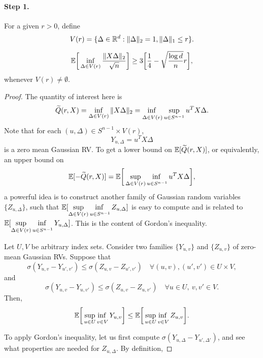 \paragraph{Step 1.}
For a given $r>0$, define
\begin{equation}
    V(r)=\{\Delta\in{\mathbb{R}}^d:\|\Delta\|_2=1,\|\Delta\|_1\le r\}.
\end{equation}
\begin{pro}\label{pro:b1}
    \begin{equation}
        \mathbb{E}\bigg[\inf_{\Delta\in V(r)}\frac{\|X\Delta\|_2}{\sqrt{n}}\bigg]\ge
            3\bigg[\frac{1}{4}-\sqrt{\frac{\log d}{n}}r\bigg],
    \end{equation}
    whenever $V(r)\neq \emptyset$.
\end{pro}
\begin{proof}
The quantity of interest here is
\begin{equation}
    \widetilde Q(r,X) = \inf_{\Delta\in V(r)}\|X\Delta\|_2
        = \adjustlimits\inf_{\Delta\in V(r)}\sup_{u\in S^{n-1}}u^TX\Delta.
\end{equation}
Note that for each $(u,\Delta)\in S^{n-1}\times V(r)$,
\begin{equation}
Y_{u,\Delta}=u^TX\Delta
\end{equation}
is a zero mean Gaussian RV.
To get a lower bound on $\mathbb{E}[\widetilde Q(r,X)]$,
or equivalently,
an upper bound on
\begin{equation}
    \Ebb[-\widetilde Q(r,X)] =
        \Ebb\bigg[\adjustlimits\sup_{\Delta\in V(r)}\inf_{u\in S^{n-1}}u^TX\Delta\bigg],
\end{equation}
a powerful idea is to construct another family of Gaussian random variables
$\{Z_{u,\Delta}\}$,
such that $\Ebb[\adjustlimits\sup_{\Delta\in V(r)}\inf_{u\in S^{n-1}}Z_{u,\Delta}]$
is easy to compute and is related to
$\Ebb[\adjustlimits\sup_{\Delta\in V(r)}\inf_{u\in S^{n-1}}Y_{u,\Delta}]$.
This is the content of Gordon's inequality.
\begin{fact}\label{fact:gordon}
Let $U,V$ be arbitrary index sets.
Consider two families $\{Y_{u,v}\}$ and $\{Z_{u,v}\}$ of zero-mean Gaussian RVs.
Suppose that
\begin{equation}
    \sigma(Y_{u,v}-Y_{u',v'})\le\sigma(Z_{u,v}-Z_{u',v'})\quad
    \forall(u,v),(u',v')\in U\times V,
\end{equation}
and
\begin{equation}
    \sigma(Y_{u,v}-Y_{u,v'})\le\sigma(Z_{u,v}-Z_{u,v'})\quad
    \forall u\in U,~ v,v'\in V.
\end{equation}
Then,
\begin{equation}
    \Ebb\bigg[\adjustlimits\sup_{u\in U}\inf_{v\in V}Y_{u,v}\bigg]\le
    \Ebb\bigg[\adjustlimits\sup_{u\in U}\inf_{v\in V}Z_{u,v}\bigg].
\end{equation}
\end{fact}

To apply Gordon's inequality,
let us first compute $\sigma(Y_{u,\Delta}-Y_{u',\Delta'})$,
and see what properties are needed for $Z_{u,\Delta}$.
By definition,

\end{proof}

